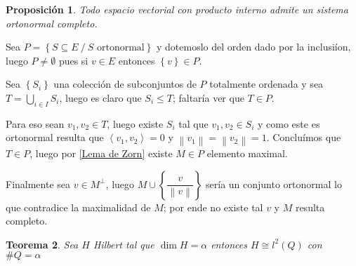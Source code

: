 \documentclass[11pt]{article}
\newcommand{\norm}[1]{\left\lVert#1\right\rVert}
\newcommand{\ip}[1]{\left\langle#1\right\rangle}
\newcommand{\sett}[1]{\left\lbrace#1\right\rbrace}
\newcommand{\Bigcup}[2]{\bigcup\limits_{#1}{#2}}
\newtheorem{theorem}{Teorema}
\numberwithin{theorem}{subsection}
\newtheorem{proposition}[theorem]{Proposici\'on}
\newenvironment{proof}[1][Demostraci\'on]{\begin{trivlist}
		\item[\hskip \labelsep {\bfseries #1}]}{\end{trivlist}}
\newcommand{\qed}{\nobreak \ifvmode \relax \else
	\ifdim\lastskip<1.5em \hskip-\lastskip
	\hskip1.5em plus0em minus0.5em \fi \nobreak
	\vrule height0.75em width0.5em depth0.25em\fi}
\begin{document}
\begin{proposition}
	\label{Existencia de sistema ortonormal completo}
	Todo espacio vectorial con producto interno admite un sistema ortonormal completo.
\end{proposition}

\begin{proof}
	Sea $P = \sett{S \subseteq E \ / \ S \text{ ortonormal}}$ y dotemoslo del orden dado por la inclusi\'ion, luego $P \neq \emptyset$ pues si $v \in E$ entonces $\sett{v} \in P$.
	
	Sea $\sett{S_i}$ una colecci\'on de subconjuntos de $P$ totalmente ordenada y sea $T = \Bigcup{i \in I}{S_i}$, luego es claro que $S_i \leq T$; faltar\'ia ver que $T \in P$.
	
	Para eso sean $v_1,v_2 \in T$, luego existe $S_i$ tal que $v_1,v_2 \in S_i$ y como este es ortonormal resulta que $\ip{v_1,v_2} = 0$ y $\norm{v_1} = \norm{v_2} = 1$. Conclu\'imos que $T \in P$, luego por \ref{Lema de Zorn} existe $M \in P$ elemento maximal.
	
	Finalmente sea $v \in M^{\perp}$, luego $M \cup \sett{\dfrac{v}{\norm{v}}}$ ser\'ia un conjunto ortonormal lo que contradice la maximalidad de $M$; por ende no existe tal $v$ y $M$ resulta completo. \qed
\end{proof}

\begin{theorem}
	\label{HIlbert congruente a un l2}
	Sea $H$ Hilbert tal que $\dim H = \alpha$ entonces $H \cong l^2(Q)$ con $\# Q = \alpha$
\end{theorem}
\end{document}
